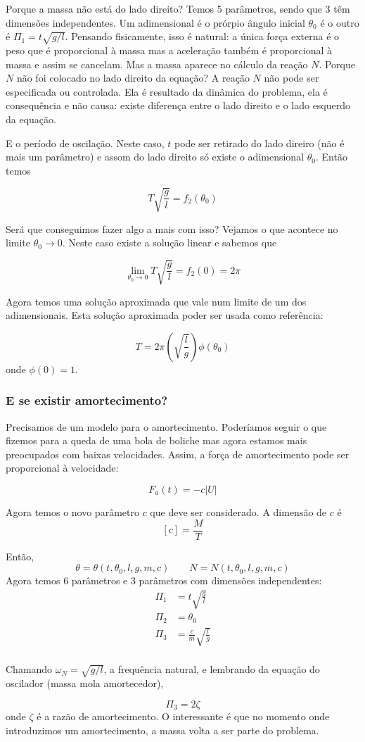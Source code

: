 Porque a massa não está do lado direito? Temos 5 parâmetros, sendo que 3 têm dimensões independentes. Um adimensional é o prórpio ângulo inicial $\theta_0$ é o outro é $\Pi_1 = t\sqrt{g/l}$. Pensando fisicamente, isso é natural: a única força externa é o peso que é proporcional à massa mas a aceleração também é proporcional à massa e assim se cancelam. Mas a massa aparece no cálculo da reação $N$. Porque $N$ não foi colocado no lado direito da equação? A reação $N$ não pode ser especificada ou controlada. Ela é resultado da dinâmica do problema, ela é consequência e não causa: existe diferença entre o lado direito e o lado esquerdo da equação.

E o período de oscilação. Neste caso, $t$ pode ser retirado do lado direiro (não é mais um parâmetro) e assom do lado direito só existe o adimensional $\theta_0$. Então temos

\[
T\sqrt{\frac{g}{l}} = f_2(\theta_0)
\]

Será que conseguimos fazer algo a mais com isso? Vejamos o que acontece no limite $\theta_0\longrightarrow 0$. Neste caso existe a solução linear e sabemos que

\[
\lim_{\theta_0\rightarrow 0}T\sqrt{\frac{g}{l}} = f_2(0) = 2\pi
\]

Agora temos uma solução aproximada que vale num limite de um dos adimensionais. Esta solução aproximada poder ser usada como referência:

\[
T = 2\pi\left(\sqrt{\frac{l}{g}}\right) \phi(\theta_0)
\]
onde $\phi(0) = 1$.

\subsubsection{E se existir amortecimento?}

Precisamos de um modelo para o amortecimento. Poderíamos seguir o que fizemos para a queda de uma bola de boliche mas agora estamos mais preocupados com baixas velocidades. Assim, a força de amortecimento pode ser proporcional à velocidade:

\[
F_a(t) = -c |U|
\]

Agora temos o novo parâmetro $c$ que deve ser considerado. A dimensão de $c$ é
\[
[c] = \frac{M}{T}
\]

Então, 
\[
\theta = \theta(t, \theta_0, l, g, m, c) \qquad N = N(t, \theta_0, l, g, m, c)
\]
Agora temos 6 parâmetros e 3 parâmetros com dimensões independentes:
\[
\begin{aligned}
  \Pi_1 &= t\sqrt{\frac{g}{l}} \\
  \Pi_2 &= \theta_0 \\
  \Pi_3 &= \frac{c}{m}\sqrt{\frac{l}{g}} \\
\end{aligned}
\]

Chamando $\omega_N = \sqrt{g/l}$, a frequência natural, e lembrando da equação do oscilador (massa mola amortecedor),

\[
\Pi_3 = 2\zeta
\]
onde $\zeta$ é a razão de amortecimento. O interessante é que no momento onde introduzimos um amortecimento, a massa volta a ser parte do problema.




